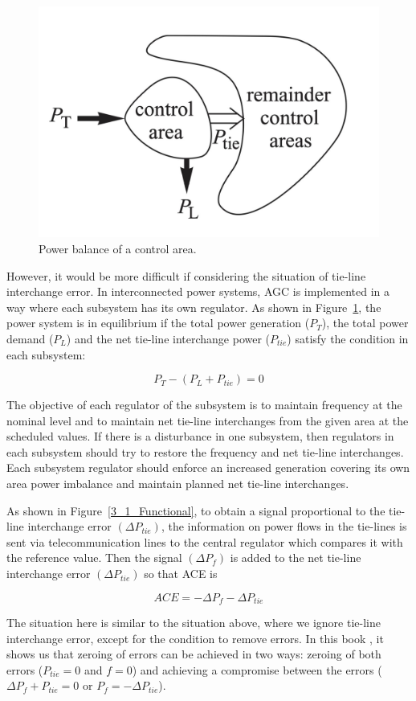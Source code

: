 \begin{figure}[t]
\center
\includegraphics[scale=0.27]{figure/3_1_Power.png}
\caption{Power balance of a control area.}
\label{3_1_Power}
\end{figure}

However, it would be more difficult if considering the situation of tie-line interchange error. In interconnected power systems, AGC is implemented in a way where each subsystem has its own regulator. As shown in Figure~\ref{3_1_Power}, the power system is in equilibrium if the total power generation ($P_T$), the total power demand ($P_L$) and the net tie-line interchange power ($P_{t i e}$) satisfy the condition in each subsystem: 

\begin{equation} \label{eq1}
P_T - (P_L + P_{t i e}) = 0
\end{equation}

The objective of each regulator of the subsystem is to \cite{machowski2011power} maintain frequency at the nominal level and to maintain net tie-line interchanges from the given area at the scheduled values. If there is a disturbance in one subsystem, then regulators in each subsystem should try to restore the frequency and net tie-line interchanges. Each subsystem regulator should enforce an increased generation covering its own area power imbalance and maintain planned net tie-line interchanges.

As shown in Figure~\ref{3_1_Functional}, to obtain a signal proportional to the tie-line interchange error $(\Delta P_{tie})$, the information on power flows in the tie-lines is sent via telecommunication lines to the central regulator which compares it with the reference value. Then the signal $(\Delta P_f)$ is added to the net tie-line interchange error $(\Delta P_{tie})$ so that ACE is


\begin{equation} \label{eq2}
ACE = - \Delta P_f - \Delta P_{tie}
\end{equation}


The situation here is similar to the situation above, where we ignore tie-line interchange error, except for the condition to remove errors. In this book \cite{machowski2011power}, it shows us that zeroing of errors can be achieved in two ways: zeroing of both errors ($ P_{tie} = 0 $ and $ f = 0 $) and achieving a compromise between the errors ($\Delta P_f + P_{tie} = 0$ or $P_f = - \Delta P_{tie}$). 